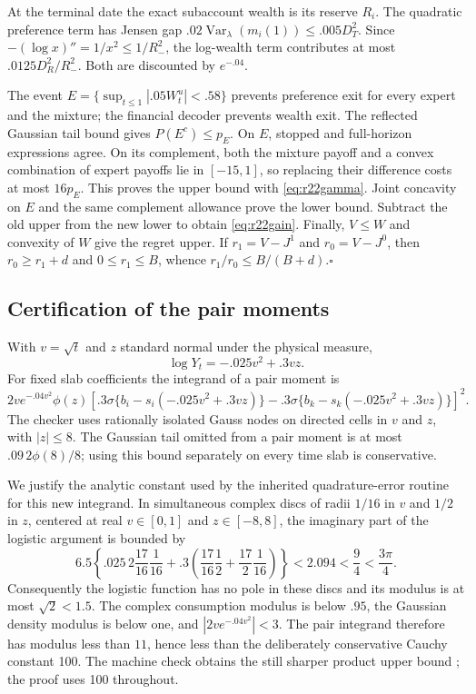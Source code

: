 At the terminal date the exact subaccount wealth is its reserve $R_i$. The quadratic preference term has Jensen gap $.02\operatorname{Var}_\lambda(m_i(1))\leq.005D_T^2$. Since $-(\log x)''=1/x^2\leq1/R_-^2$, the log-wealth term contributes at most $.0125D_R^2/R_-^2$. Both are discounted by $e^{-.04}$.

The event $E=\{\sup_{t\leq1}|.05W_t^u|<.58\}$ prevents preference exit for every expert and the mixture; the financial decoder prevents wealth exit. The reflected Gaussian tail bound gives $P(E^c)\leq p_E$. On $E$, stopped and full-horizon expressions agree. On its complement, both the mixture payoff and a convex combination of expert payoffs lie in $[-15,1]$, so replacing their difference costs at most $16p_E$. This proves the upper bound with \eqref{eq:r22gamma}. Joint concavity on $E$ and the same complement allowance prove the lower bound. Subtract the old upper from the new lower to obtain \eqref{eq:r22gain}. Finally, $V\leq W$ and convexity of $W$ give the regret upper. If $r_1=V-J^1$ and $r_0=V-J^0$, then $r_0\geq r_1+d$ and $0\leq r_1\leq B$, whence $r_1/r_0\leq B/(B+d)$.\hfill$\square$

\subsection{Certification of the pair moments}\label{app:r22quadrature}
With $v=\sqrt t$ and $z$ standard normal under the physical measure,
\[
 \log Y_t=-.025v^2+.3vz.
\]
For fixed slab coefficients the integrand of a pair moment is
\[
 2v e^{-.04v^2}\phi(z)
 \left[.3\sigma\{b_i-s_i(-.025v^2+.3vz)\}
       -.3\sigma\{b_k-s_k(-.025v^2+.3vz)\}\right]^2.
\]
The checker uses rationally isolated Gauss nodes on directed cells in $v$ and $z$, with $|z|\leq8$. The Gaussian tail omitted from a pair moment is at most $.09\,2\phi(8)/8$; using this bound separately on every time slab is conservative.

We justify the analytic constant used by the inherited quadrature-error routine for this new integrand. In simultaneous complex discs of radii $1/16$ in $v$ and $1/2$ in $z$, centered at real $v\in[0,1]$ and $z\in[-8,8]$, the imaginary part of the logistic argument is bounded by
\[
 6.5\left\{.025\,2\frac{17}{16}\frac1{16}
       +.3\left(\frac{17}{16}\frac12+\frac{17}{2}\frac1{16}\right)\right\}
 <2.094<\frac94<\frac{3\pi}{4}.
\]
Consequently the logistic function has no pole in these discs and its modulus is at most $\sqrt2<1.5$. The complex consumption modulus is below $.95$, the Gaussian density modulus is below one, and $|2v e^{-.04v^2}|<3$. The pair integrand therefore has modulus less than $11$, hence less than the deliberately conservative Cauchy constant 100. The machine check obtains the still sharper product upper bound \RXXIIComplexBound{}; the proof uses 100 throughout.

